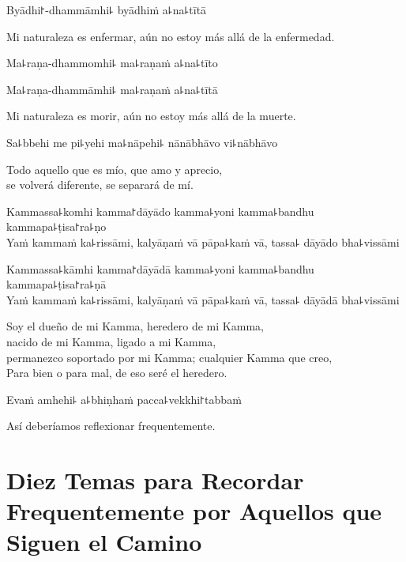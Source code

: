 %
Byādhi꜓-dhammāmhi꜕ byādhiṁ a꜕na꜕tītā

\begin{english}
  Mi naturaleza es enfermar, aún no estoy más allá de la enfermedad.
\end{english}

%
Ma꜕raṇa-dhammomhi꜕ ma꜕raṇaṁ a꜕na꜕tīto

%
Ma꜕raṇa-dhammāmhi꜕ ma꜕raṇaṁ a꜕na꜕tītā

\begin{english}
  Mi naturaleza es morir, aún no estoy más allá de la muerte.
\end{english}

Sa꜕bbehi me pi꜕yehi ma꜕nāpehi꜕ nānābhāvo vi꜕nābhāvo

\begin{english}
  Todo aquello que es mío, que amo y aprecio,\\
  se volverá diferente, se separará de mí.
\end{english}

%
Kammassa꜕komhi kamma꜓dāyādo kamma꜕yoni kamma꜕bandhu kammapa꜕ṭisa꜓ra꜕ṇo\\
Yaṁ kammaṁ ka꜕rissāmi, kalyāṇaṁ vā pāpa꜕kaṁ vā, tassa꜕ dāyādo bha꜕vissāmi

\clearpage

%
Kammassa꜕kāmhi kamma꜓dāyādā kamma꜕yoni kamma꜕bandhu kammapa꜕ṭisa꜓ra꜕ṇā\\
Yaṁ kammaṁ ka꜕rissāmi, kalyāṇaṁ vā pāpa꜕kaṁ vā, tassa꜕ dāyādā bha꜕vissāmi

\begin{english}
  Soy el dueño de mi Kamma, heredero de mi Kamma, \\
  nacido de mi Kamma, ligado a mi Kamma,\\
  permanezco soportado por mi Kamma; cualquier Kamma que creo, \\
  Para bien o para mal, de eso seré el heredero.
\end{english}

Evaṁ amhehi꜕ a꜕bhiṇhaṁ pacca꜕vekkhi꜓tabbaṁ

\begin{english}
  Así deberíamos reflexionar frequentemente.
\end{english}

\chapter[Diez Temas]{Diez Temas para Recordar Frequentemente por Aquellos que Siguen el Camino}

